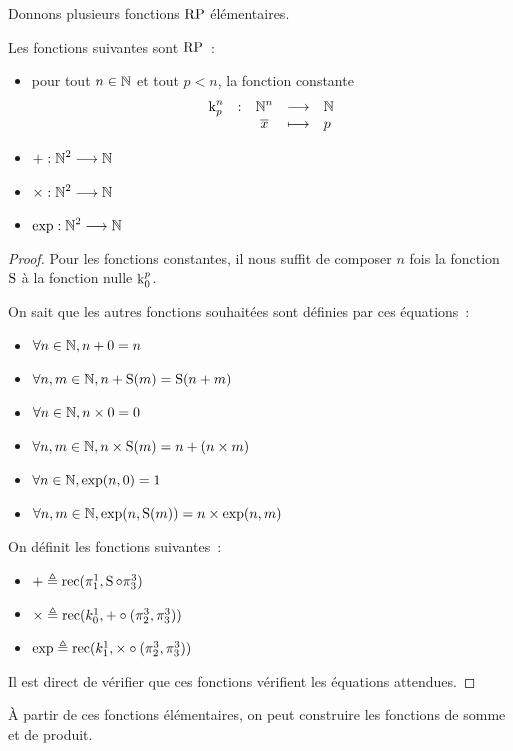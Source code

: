 \noindent
Donnons plusieurs fonctions $\operatorname{RP}$ élémentaires.

\begin{proposition}\label{fct.RP.1}
  Les fonctions suivantes sont $\operatorname{RP}$~:
  \begin{itemize}
  \item pour tout $n \in \mathbb N$ et tout $p < n$, la fonction
    constante
    \[\makeFun{\csKP{p}{n}}{\bN^n}{\bN}{\vec x}{p}\]
  \item $+ : \displaystyle \mathbb N^2 \longrightarrow \mathbb N$
  \item $\times : \displaystyle \mathbb N^2 \longrightarrow \mathbb N$
  \item $\exp : \displaystyle \mathbb N^2 \longrightarrow \mathbb N$
  \end{itemize}
\end{proposition}

\begin{proof}
  Pour les fonctions constantes, il nous suffit de composer $n$ fois la fonction
  $\operatorname{S}$ à la fonction nulle $\operatorname{k}_{0}^{p}$.
  
  On sait que les autres fonctions souhaitées sont définies par ces équations~:
  \begin{itemize}
  \item $\forall n \in \mathbb N, n+0 = n$
  \item $\forall n,m \in \mathbb N, n + \operatorname{S}(m) = \operatorname{S}(n+m)$
  \item $\forall n \in \mathbb N, n \times 0 = 0$
  \item $\forall n,m \in \mathbb N, n \times \operatorname{S}(m) = n + (n\times m)$
  \item $\forall n \in \mathbb N, \exp(n,0) = 1$
  \item $\forall n,m\in \mathbb N, \exp(n,\operatorname{S}(m)) = n \times \exp(n,m)$
  \end{itemize}
  On définit les fonctions suivantes~:
  \begin{itemize}
  \item $\mathord{+} \triangleq \operatorname{rec}(\pi_1^1,\operatorname{S}\circ \pi_3^3)$
  \item $\mathord{\times} \triangleq \operatorname{rec}(k_0^1,\mathord{+} \circ (\pi_2^3,\pi_3^3))$
  \item $\exp \triangleq \operatorname{rec}(k_1^1,\mathord{\times}\circ (\pi_2^3,\pi_3^3))$
  \end{itemize}
  Il est direct de vérifier que ces fonctions vérifient les équations attendues.
\end{proof}

\`A partir de ces fonctions élémentaires, on peut construire les fonctions de
somme et de produit.

